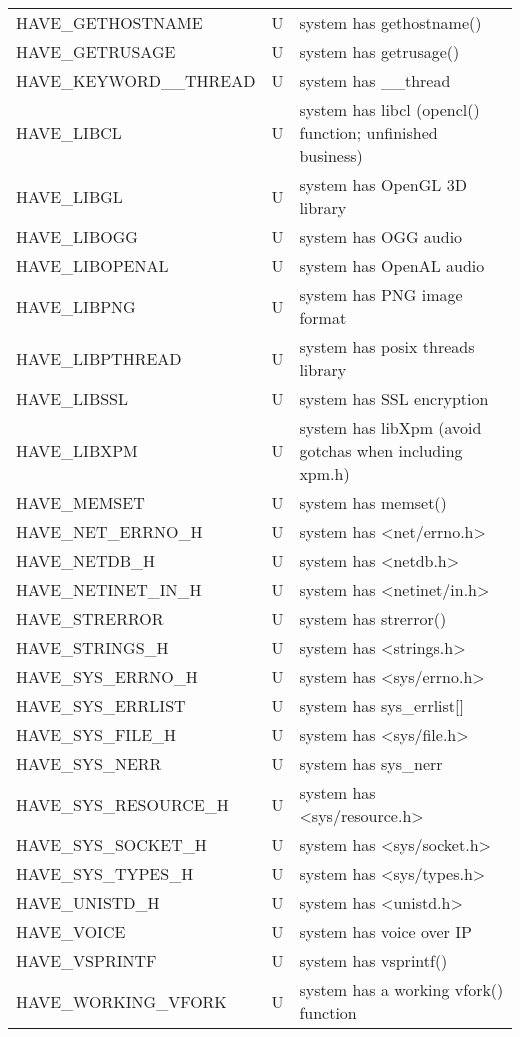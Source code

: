 \begin{xtabular}{|m{1.8in}|m{0.5in}|m{4.0in}|}
HAVE\_GETHOSTNAME & U & system has gethostname() \\
HAVE\_GETRUSAGE & U & system has getrusage() \\
HAVE\_KEYWORD\_\_THREAD & U & system has \_\_thread \\
HAVE\_LIBCL & U & system has libcl (opencl() function; unfinished business) \\
HAVE\_LIBGL & U & system has OpenGL 3D library \\
HAVE\_LIBOGG & U & system has OGG audio \\
HAVE\_LIBOPENAL & U & system has OpenAL audio \\
HAVE\_LIBPNG & U & system has PNG image format \\
HAVE\_LIBPTHREAD & U & system has posix threads library \\
HAVE\_LIBSSL & U & system has SSL encryption \\
HAVE\_LIBXPM & U & system has libXpm (avoid gotchas when including xpm.h) \\
HAVE\_MEMSET & U & system has memset() \\
HAVE\_NET\_ERRNO\_H & U & system has <net/errno.h> \\
HAVE\_NETDB\_H & U & system has <netdb.h> \\
HAVE\_NETINET\_IN\_H & U & system has <netinet/in.h> \\
HAVE\_STRERROR & U & system has strerror() \\
HAVE\_STRINGS\_H & U & system has <strings.h> \\
HAVE\_SYS\_ERRNO\_H & U & system has <sys/errno.h> \\
HAVE\_SYS\_ERRLIST & U & system has sys\_errlist[] \\
HAVE\_SYS\_FILE\_H & U & system has <sys/file.h> \\
HAVE\_SYS\_NERR & U & system has sys\_nerr \\
HAVE\_SYS\_RESOURCE\_H & U & system has <sys/resource.h> \\
HAVE\_SYS\_SOCKET\_H & U & system has <sys/socket.h> \\
HAVE\_SYS\_TYPES\_H & U & system has <sys/types.h> \\
HAVE\_UNISTD\_H & U & system has <unistd.h> \\
HAVE\_VOICE & U & system has voice over IP \\
HAVE\_VSPRINTF & U & system has vsprintf() \\
HAVE\_WORKING\_VFORK & U & system has a working vfork() function \\

\end{xtabular}
